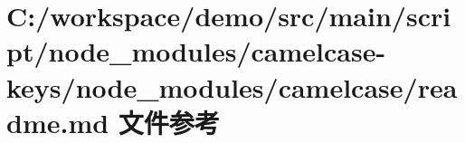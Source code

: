 \hypertarget{node__modules_2camelcase-keys_2node__modules_2camelcase_2_r_e_a_d_m_e_8md}{}\section{C\+:/workspace/demo/src/main/script/node\+\_\+modules/camelcase-\/keys/node\+\_\+modules/camelcase/readme.md 文件参考}
\label{node__modules_2camelcase-keys_2node__modules_2camelcase_2_r_e_a_d_m_e_8md}
